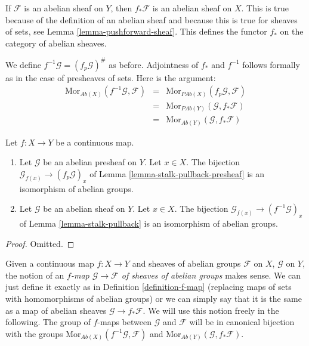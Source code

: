 \medskip\noindent
If $\mathcal{F}$ is an abelian sheaf on $Y$, then $f_*\mathcal{F}$
is an abelian sheaf on $X$. This is true because of the definition
of an abelian sheaf and because this is true for sheaves of sets,
see Lemma \ref{lemma-pushforward-sheaf}. This defines the functor
$f_*$ on the category of abelian sheaves.

\medskip\noindent
We define $f^{-1}\mathcal{G} = (f_p\mathcal{G})^\#$ as before.
Adjointness of $f_*$ and $f^{-1}$ follows formally as in
the case of presheaves of sets. Here is the argument:
\begin{eqnarray*}
\text{Mor}_{\textit{Ab}(X)}(f^{-1}\mathcal{G}, \mathcal{F})
& = &
\text{Mor}_{\textit{PAb}(X)}(f_p\mathcal{G}, \mathcal{F}) \\
& = &
\text{Mor}_{\textit{PAb}(Y)}(\mathcal{G}, f_*\mathcal{F}) \\
& = &
\text{Mor}_{\textit{Ab}(Y)}(\mathcal{G}, f_*\mathcal{F})
\end{eqnarray*}

\begin{lemma}
\label{lemma-pullback-abelian-stalk}
Let $f : X \to Y$ be a continuous map.
\begin{enumerate}
\item Let $\mathcal{G}$ be an abelian presheaf on $Y$.
Let $x \in X$. The bijection
$\mathcal{G}_{f(x)} \to (f_p\mathcal{G})_x$ of
Lemma \ref{lemma-stalk-pullback-presheaf} is an isomorphism of abelian groups.
\item Let $\mathcal{G}$ be an abelian sheaf on $Y$.
Let $x \in X$. The bijection
$\mathcal{G}_{f(x)} \to (f^{-1}\mathcal{G})_x$ of
Lemma \ref{lemma-stalk-pullback} is an isomorphism of abelian groups.
\end{enumerate}
\end{lemma}

\begin{proof}
Omitted.
\end{proof}

\noindent
Given a continuous map $f : X \to Y$ and sheaves of abelian
groups $\mathcal{F}$ on $X$, $\mathcal{G}$ on $Y$, the notion
of an {\it $f$-map $\mathcal{G} \to \mathcal{F}$
of sheaves of abelian groups} makes sense. We can just define
it exactly as in Definition \ref{definition-f-map} (replacing maps
of sets with homomorphisms of abelian groups) or we can
simply say that it is the same as a map of abelian
sheaves $\mathcal{G} \to f_*\mathcal{F}$. We will use this
notion freely in the following. The group of $f$-maps between
$\mathcal{G}$ and $\mathcal{F}$ will be in canonical bijection
with the groups
$\text{Mor}_{\textit{Ab}(X)}(f^{-1}\mathcal{G}, \mathcal{F})$
and
$\text{Mor}_{\textit{Ab}(Y)}(\mathcal{G}, f_*\mathcal{F})$.

